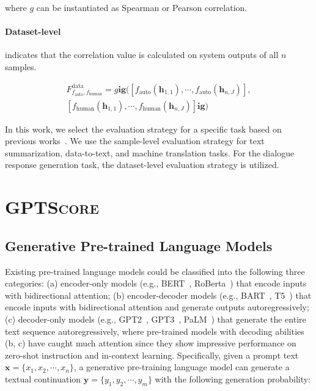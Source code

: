 where $g$ can be instantiated as Spearman or Pearson correlation.

\paragraph{Dataset-level} indicates that the correlation value is calculated on system outputs of all $n$ samples.

\begin{equation*}
\begin{split}
    F^{\text{data}}_{f_{\text{auto}}, f_{\text{human}}} = g\mathbf{ig}(
    \left[f_{\text{auto}}(\bm{h}_{1,1}), \cdots, f_{\text{auto}}(\bm{h}_{n, J})\right], \\
    \left[f_{\text{human}}(\bm{h}_{1,1}), \cdots, f_{\text{human}}(\bm{h}_{n, J})\right]
    \mathbf{ig})
\end{split}
\end{equation*}

In this work, we select the evaluation strategy for a specific task based on previous works~\cite{bartscore2021yuan,Zhang:fineD}. We use the sample-level evaluation strategy for text summarization, data-to-text, and machine translation tasks. For the dialogue response generation task, the dataset-level evaluation strategy is utilized.

\section{\textsc{GPTScore}}

\subsection{Generative Pre-trained Language Models} Existing pre-trained language models could be classified into the following three categories: (a) encoder-only models (e.g., BERT~\cite{devlin:bert}, RoBerta~\cite{liu:roberta}) that encode inputs with bidirectional attention; (b) encoder-decoder models (e.g., BART~\cite{bart:mike}, T5~\cite{colin:t5}) that encode inputs with bidirectional attention and generate outputs autoregressively; (c) decoder-only models (e.g., GPT2~\cite{radford2019language}, GPT3~\cite{tom:gpt3}, PaLM~\cite{chowdhery:palm}) that generate the entire text sequence autoregressively, where pre-trained models with decoding abilities (b, c) have caught much attention since they show impressive performance on zero-shot instruction and in-context learning. Specifically, given a prompt text $\bm{x} = \{x_1, x_2, \cdots, x_n\}$, a generative pre-training language model can generate a textual continuation $\bm{y} = \{y_1, y_2, \cdots, y_m\}$ with the following generation probability:

